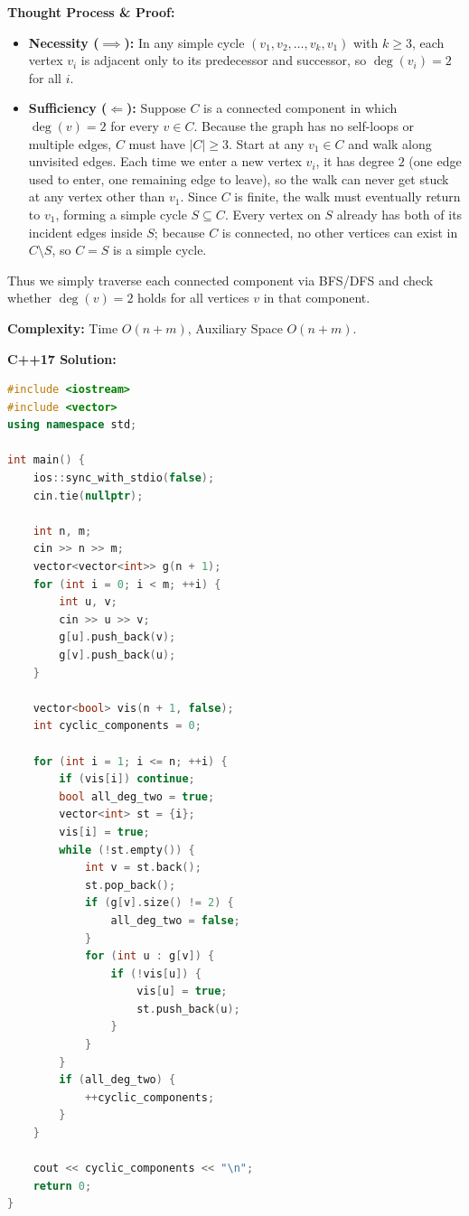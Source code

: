 \documentclass[11pt]{article}
\begin{document}
\textbf{Thought Process \& Proof:}
\begin{itemize}
    \item \textbf{Necessity ($\implies$):} In any simple cycle $(v_1, v_2, \dots, v_k, v_1)$ with $k \ge 3$, each vertex $v_i$ is adjacent only to its predecessor and successor, so $\deg(v_i) = 2$ for all $i$.
    \item \textbf{Sufficiency ($\Longleftarrow$):} Suppose $C$ is a connected component in which $\deg(v) = 2$ for every $v \in C$. Because the graph has no self-loops or multiple edges, $C$ must have $|C| \ge 3$. Start at any $v_1 \in C$ and walk along unvisited edges. Each time we enter a new vertex $v_i$, it has degree $2$ (one edge used to enter, one remaining edge to leave), so the walk can never get stuck at any vertex other than $v_1$. Since $C$ is finite, the walk must eventually return to $v_1$, forming a simple cycle $S \subseteq C$. Every vertex on $S$ already has both of its incident edges inside $S$; because $C$ is connected, no other vertices can exist in $C \setminus S$, so $C = S$ is a simple cycle.
\end{itemize}
Thus we simply traverse each connected component via BFS/DFS and check whether $\deg(v) = 2$ holds for all vertices $v$ in that component.

\textbf{Complexity:} Time $O(n + m)$, Auxiliary Space $O(n + m)$.

\textbf{C++17 Solution:}
\begin{lstlisting}[language=C++]
#include <iostream>
#include <vector>
using namespace std;

int main() {
    ios::sync_with_stdio(false);
    cin.tie(nullptr);

    int n, m;
    cin >> n >> m;
    vector<vector<int>> g(n + 1);
    for (int i = 0; i < m; ++i) {
        int u, v;
        cin >> u >> v;
        g[u].push_back(v);
        g[v].push_back(u);
    }

    vector<bool> vis(n + 1, false);
    int cyclic_components = 0;

    for (int i = 1; i <= n; ++i) {
        if (vis[i]) continue;
        bool all_deg_two = true;
        vector<int> st = {i};
        vis[i] = true;
        while (!st.empty()) {
            int v = st.back();
            st.pop_back();
            if (g[v].size() != 2) {
                all_deg_two = false;
            }
            for (int u : g[v]) {
                if (!vis[u]) {
                    vis[u] = true;
                    st.push_back(u);
                }
            }
        }
        if (all_deg_two) {
            ++cyclic_components;
        }
    }

    cout << cyclic_components << "\n";
    return 0;
}
\end{lstlisting}
\end{document}
